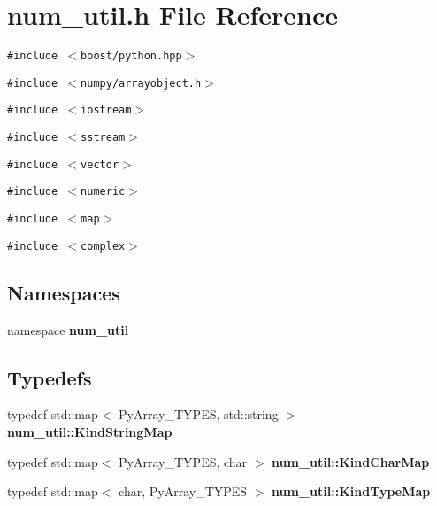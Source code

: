 \section{num\_\-util.h File Reference}
\label{num__util_8h}
{\tt \#include $<$boost/python.hpp$>$}\par
{\tt \#include $<$numpy/arrayobject.h$>$}\par
{\tt \#include $<$iostream$>$}\par
{\tt \#include $<$sstream$>$}\par
{\tt \#include $<$vector$>$}\par
{\tt \#include $<$numeric$>$}\par
{\tt \#include $<$map$>$}\par
{\tt \#include $<$complex$>$}\par
\subsection*{Namespaces}
\begin{CompactItemize}
\item 
namespace {\bf num\_\-util}
\end{CompactItemize}
\subsection*{Typedefs}
\begin{CompactItemize}
\item 
typedef std::map$<$ Py\-Array\_\-TYPES, std::string $>$ {\bf num\_\-util::Kind\-String\-Map}
\item 
typedef std::map$<$ Py\-Array\_\-TYPES, char $>$ {\bf num\_\-util::Kind\-Char\-Map}
\item 
typedef std::map$<$ char, Py\-Array\_\-TYPES $>$ {\bf num\_\-util::Kind\-Type\-Map}
\end{CompactItemize}
